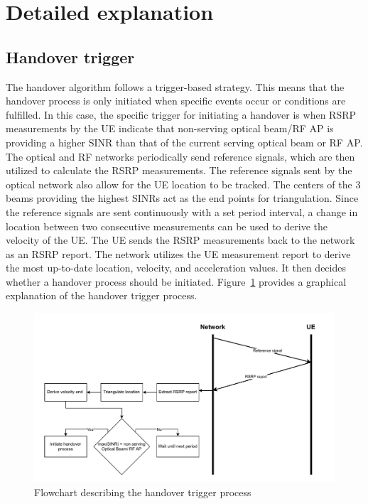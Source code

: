 \section{Detailed explanation}
\label{subsec:algo_exp}
\subsection{Handover trigger}
The handover algorithm follows a trigger-based strategy. This means that the handover process is only initiated when specific events occur or conditions are fulfilled. In this case, the specific trigger for initiating a handover is when RSRP measurements by the UE indicate that non-serving optical beam/RF AP is providing a higher SINR than that of the current serving optical beam or RF AP. The optical and RF networks periodically send reference signals, which are then utilized to calculate the RSRP measurements. The reference signals sent by the optical network also allow for the UE location to be tracked. The centers of the 3 beams providing the highest SINRs act as the end points for triangulation. Since the reference signals are sent continuously with a set period interval, a change in location between two consecutive measurements can be used to derive the velocity of the UE. The UE sends the RSRP measurements back to the network as an RSRP report. The network utilizes the UE measurement report to derive the most up-to-date location, velocity, and acceleration values. It then decides whether a handover process should be initiated. Figure~\ref{fig: handover-trigger} provides a graphical explanation of the handover trigger process.
% 
\begin{figure}
    \centering
    \includegraphics[width=1\linewidth]{Figures/Algorithm-design-Handover-trigger.drawio.pdf}
    \caption{Flowchart describing the handover trigger process}
    \label{fig: handover-trigger}
\end{figure}

